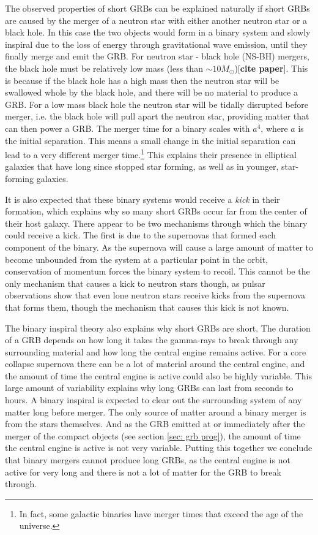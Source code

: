 \documentclass[11pt]{cuthesis}
\begin{document}
The observed properties of short GRBs can be explained naturally if short GRBs are caused by the merger of a neutron star with either another neutron star or a black hole. In this case the two objects would form in a binary system and slowly inspiral due to the loss of energy through gravitational wave emission, until they finally merge and emit the GRB. For neutron star - black hole (NS-BH) mergers, the black hole must be relatively low mass (less than $\sim 10M_\odot$)[\textbf{cite paper}]. This is because if the black hole has a high mass then the neutron star will be swallowed whole by the black hole, and there will be no material to produce a GRB. For a low mass black hole the neutron star will be tidally disrupted before merger, i.e. the black hole will pull apart the neutron star, providing matter that can then power a GRB. The merger time for a binary scales with $a^4$, where $a$ is the initial separation. This means a small change in the initial separation can lead to a very different merger time.\footnote{In fact, some galactic binaries have merger times that exceed the age of the universe.} This explains their presence in elliptical galaxies that have long since stopped star forming, as well as in younger, star-forming galaxies. 

It is also expected that these binary systems would receive a \textit{kick} in their formation, which explains why so many short GRBs occur far from the center of their host galaxy. There appear to be two mechanisms through which the binary could receive a kick. The first is due to the supernovas that formed each component of the binary. As the supernova will cause a large amount of matter to become unbounded from the system at a particular point in the orbit, conservation of momentum forces the binary system to recoil. This cannot be the only mechanism that causes a kick to neutron stars though, as pulsar observations show that even lone neutron stars receive kicks from the supernova that forms them, though the mechanism that causes this kick is not known. 

The binary inspiral theory also explains why short GRBs are short. The duration of a GRB depends on how long it takes the gamma-rays to break through any surrounding material and how long the central engine remains active. For a core collapse supernova there can be a lot of material around the central engine, and the amount of time the central engine is active could also be highly variable. This large amount of variability explains why long GRBs can last from seconds to hours. A binary inspiral is expected to clear out the surrounding system of any matter long before merger. The only source of matter around a binary merger is from the stars themselves. And as the GRB emitted at or immediately after the merger of the compact objects (see section \ref{sec: grb prog}), the amount of time the central engine is active is not very variable. Putting this together we conclude that binary mergers cannot produce long GRBs, as the central engine is not active for very long and there is not a lot of matter for the GRB to break through.
\end{document}
